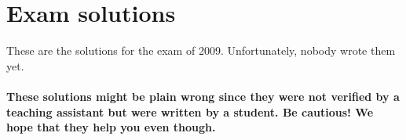 \documentclass[main]{subfiles}
\begin{document}

\section{Exam solutions}
These are the solutions for the exam of 2009. Unfortunately, nobody wrote them yet.
\\\\
\textbf{These solutions might be plain wrong since they were not verified by a teaching assistant but were written by a student. Be cautious! We hope that they help you even though.}

\end{document}
